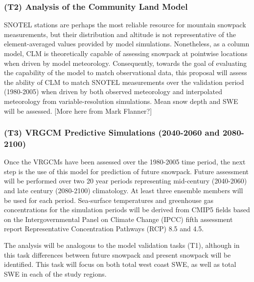 \documentclass[11pt]{article}
\begin{document}
\subsubsection{(T2) Analysis of the Community Land Model}

SNOTEL stations are perhaps the most reliable resource for mountain snowpack measurements, but their distribution and altitude is not representative of the element-averaged values provided by model simulations.  Nonetheless, as a column model, CLM is theoretically capable of assessing snowpack at pointwise locations when driven by model meteorology.  Consequently, towards the goal of evaluating the capability of the model to match observational data, this proposal will assess the ability of CLM to match SNOTEL measurements over the validation period (1980-2005) when driven by both observed meteorology and interpolated meteorology from variable-resolution simulations.  Mean snow depth and SWE will be assessed.  {\color{red} [More here from Mark Flanner?]}

\subsubsection{(T3) VRGCM Predictive Simulations (2040-2060 and 2080-2100)}

Once the VRGCMs have been assessed over the 1980-2005 time period, the next step is the use of this model for prediction of future snowpack.  Future assessment will be performed over two 20 year periods representing mid-century (2040-2060) and late century (2080-2100) climatology.  At least three ensemble members will be used for each period.  Sea-surface temperatures and greenhouse gas concentrations for the simulation periods will be derived from CMIP5 fields based on the Intergovernmental Panel on Climate Change (IPCC) fifth assessment report Representative Concentration Pathways (RCP) 8.5 and 4.5.

The analysis will be analogous to the model validation tasks (T1), although in this task differences between future snowpack and present snowpack will be identified.  This task will focus on both total west coast SWE, as well as total SWE in each of the study regions.


\end{document}
